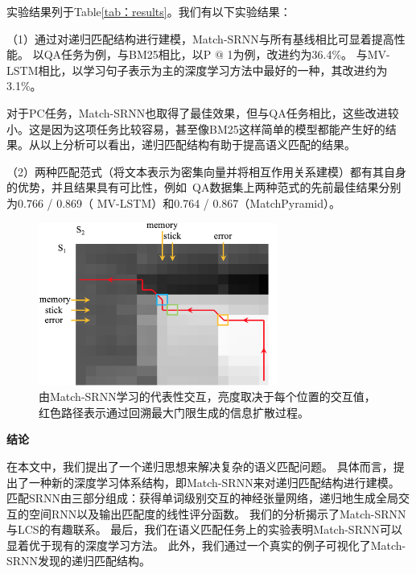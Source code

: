 实验结果列于Table\ref{tab：results}。我们有以下实验结果：

（1）通过对递归匹配结构进行建模，Match-SRNN与所有基线相比可显着提高性能。
以QA任务为例，与BM25相比，以P $@$ 1为例，改进约为36.4\%。
与MV-LSTM相比，以学习句子表示为主的深度学习方法中最好的一种，其改进约为3.1\%。

对于PC任务，Match-SRNN也取得了最佳效果，但与QA任务相比，这些改进较小。这是因为这项任务比较容易，甚至像BM25这样简单的模型都能产生好的结果。从以上分析可以看出，递归匹配结构有助于提高语义匹配的结果。

（2）两种匹配范式（将文本表示为密集向量并将相互作用关系建模）都有其自身的优势，并且结果具有可比性，例如~QA数据集上两种范式的先前最佳结果分别为0.766 / 0.869（ MV-LSTM）和0.764 / 0.867（MatchPyramid）。

\begin{figure}[t]
\includegraphics[width=0.7\textwidth]{figures/qa_path.png}
\caption{由Match-SRNN学习的代表性交互，亮度取决于每个位置的交互值，红色路径表示通过回溯最大门限生成的信息扩散过程。}
\label{fig:tensor}
\end{figure}

\textbf{结论}

在本文中，我们提出了一个递归思想来解决复杂的语义匹配问题。
具体而言，提出了一种新的深度学习体系结构，即Match-SRNN来对递归匹配结构进行建模。 匹配SRNN由三部分组成：获得单词级别交互的神经张量网络，递归地生成全局交互的空间RNN以及输出匹配度的线性评分函数。 我们的分析揭示了Match-SRNN与LCS的有趣联系。 最后，我们在语义匹配任务上的实验表明Match-SRNN可以显着优于现有的深度学习方法。 此外，我们通过一个真实的例子可视化了Match-SRNN发现的递归匹配结构。




